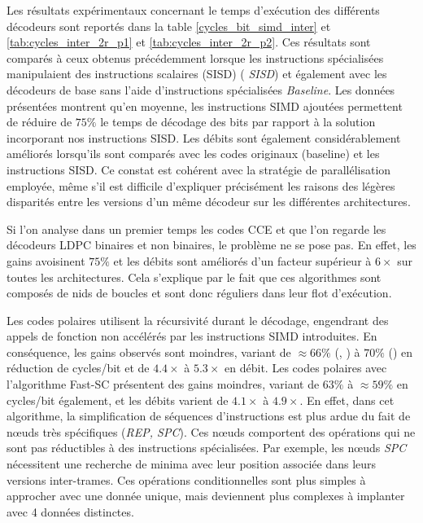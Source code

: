 \documentclass[../main.tex]{subfiles}
\begin{document}
Les résultats expérimentaux concernant le temps d'exécution des différents décodeurs sont reportés dans la table \ref{cycles_bit_simd_inter} et \ref{tab:cycles_inter_2r_p1} et \ref{tab:cycles_inter_2r_p2}.
Ces résultats sont comparés à ceux obtenus précédemment lorsque les instructions spécialisées manipulaient des instructions scalaires (SISD) (\textit{ SISD}) et également avec les décodeurs de base sans l'aide d'instructions spécialisées \textit{ Baseline}.
Les données présentées montrent qu'en moyenne, les instructions SIMD ajoutées permettent de réduire de $75\%$ le temps de décodage des bits par rapport à la solution incorporant nos instructions SISD. 
Les débits sont également considérablement améliorés lorsqu'ils sont comparés avec les codes originaux (baseline) et les instructions SISD.
Ce constat est cohérent avec la stratégie de parallélisation employée, même s'il est difficile d'expliquer précisément les raisons des légères disparités entre les versions d'un même décodeur sur les différentes architectures.

Si l'on analyse dans un premier temps les codes CCE et que l'on regarde les décodeurs LDPC binaires et non binaires, le problème ne se pose pas.
En effet, les gains avoisinent $75\%$ et les débits sont améliorés d'un facteur supérieur à $6\times$ sur toutes les architectures. 
Cela s'explique par le fait que ces algorithmes sont composés de nids de boucles et sont donc réguliers dans leur flot d'exécution.

Les codes polaires utilisent la récursivité durant le décodage, engendrant des appels de fonction non accélérés par les instructions SIMD introduites. 
En conséquence, les gains observés sont moindres, variant de $\approx 66\%$ (\IBEX , \RISCY ) à $70\%$ (\SCR) en réduction de cycles/bit et de $4.4\times$ à $5.3\times$ en débit. 
Les codes polaires avec l'algorithme Fast-SC présentent des gains moindres, variant de $63\%$ à $\approx 59\%$ en cycles/bit également, et les débits varient de $4.1\times$ à $4.9\times$. 
En effet, dans cet algorithme, la simplification de séquences d'instructions est plus ardue du fait de nœuds très spécifiques (\textit{REP, SPC}). 
Ces nœuds comportent des opérations qui ne sont pas réductibles à des instructions spécialisées.
Par exemple, les nœuds \textit{SPC} nécessitent une recherche de minima avec leur position associée dans leurs versions inter-trames. 
Ces opérations conditionnelles sont plus simples à approcher avec une donnée unique, mais deviennent plus complexes à implanter avec 4 données distinctes.  
\end{document}
